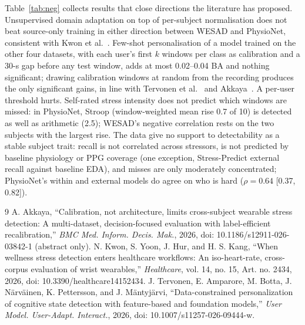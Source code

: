 \documentclass[journal]{IEEEtran}
\begin{document}
Table~\ref{tab:neg} collects results that close directions the literature has proposed. Unsupervised domain adaptation on top of per-subject normalisation does not beat source-only training in either direction between WESAD and PhysioNet, consistent with Kwon et al.~\cite{kwon2026}. Few-shot personalisation of a model trained on the other four datasets, with each user's first $k$ windows per class as calibration and a 30-s gap before any test window, adds at most 0.02--0.04 BA and nothing significant; drawing calibration windows at random from the recording produces the only significant gains, in line with Tervonen et al.~\cite{tervonen2026} and Akkaya~\cite{akkaya2026}. A per-user threshold hurts. Self-rated stress intensity does not predict which windows are missed: in PhysioNet, Stroop (window-weighted mean rise 0.7 of 10) is detected as well as arithmetic (2.5); WESAD's negative correlation rests on the two subjects with the largest rise. The data give no support to detectability as a stable subject trait: recall is not correlated across stressors, is not predicted by baseline physiology or PPG coverage (one exception, Stress-Predict external recall against baseline EDA), and misses are only moderately concentrated; PhysioNet's within and external models do agree on who is hard ($\rho=0.64$ [0.37, 0.82]).


\begin{thebibliography}{9}
 A. Akkaya, ``Calibration, not architecture, limits cross-subject wearable stress detection: A multi-dataset, decision-focused evaluation with label-efficient recalibration,'' \emph{BMC Med. Inform. Decis. Mak.}, 2026, doi: 10.1186/s12911-026-03842-1 (abstract only).
 N. Kwon, S. Yoon, J. Hur, and H. S. Kang, ``When wellness stress detection enters healthcare workflows: An iso-heart-rate, cross-corpus evaluation of wrist wearables,'' \emph{Healthcare}, vol. 14, no. 15, Art. no. 2434, 2026, doi: 10.3390/healthcare14152434.
 J. Tervonen, E. Amparore, M. Botta, J. N\"arv\"ainen, K. Pettersson, and J. M\"antyj\"arvi, ``Data-constrained personalization of cognitive state detection with feature-based and foundation models,'' \emph{User Model. User-Adapt. Interact.}, 2026, doi: 10.1007/s11257-026-09444-w.
\end{thebibliography}
\end{document}
